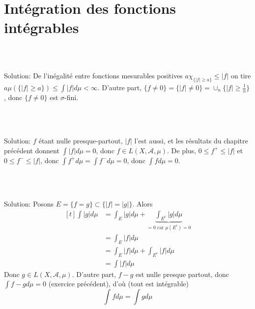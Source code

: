 \documentclass{report}
\begin{document}
\newpage

\section{Intégration des fonctions intégrables}

\subsection{} \\ \\

Solution: De l'inégalité entre fonctions mesurables positives $a\chi_{\{|f|\geq a\}} \leq |f|$ on tire $a\mu(\{|f|\geq a\})\leq \int |f| d\mu <\infty$.\newline
D'autre part, $\{f\neq 0\}=\{|f|\neq 0\}=\cup_n \{|f|\geq \frac 1n\}$, donc $\{f\neq 0\}$ est $\sigma$-fini.

\subsection{} \\ \\

Solution: $f$ étant nulle presque-partout, $|f|$ l'est aussi, et les résultats du chapitre précédent donnent $\int |f| d\mu = 0$, donc $f\in L(X,\mathcal A,\mu)$. \newline
De plus, $0\leq f^+\leq |f|$ et $0\leq f^-\leq |f|$, donc $\int f^+ d\mu =\int f^- d\mu = 0$, donc $\int f d\mu = 0$.

\subsection{} \\ \\

Solution: Posons $E=\{f=g\}\subset \{|f|=|g|\}$. Alors $$\begin{aligned}[t] \int |g| d\mu &= \int_E |g| d\mu + \underbrace{\int_{E^c} |g| d\mu}_{=0 \text{ car }\mu(E^c)=0} \\
&= \int_E |f| d\mu \\
&= \int_E |f| d\mu  + \int_{E^c} |f| d\mu \\
&= \int |f| d\mu
\end{aligned}$$
Donc $g\in L(X,\mathcal A,\mu)$. D'autre part, $f-g$ est nulle presque partout, \newline
donc $\int f-g d\mu = 0$ (exercice précédent), d'où (tout est intégrable) $$\int f d\mu = \int g d\mu$$
\end{document}
